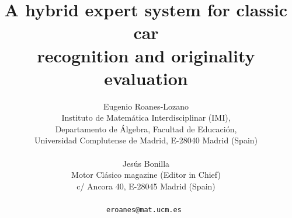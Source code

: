 \documentclass[a4paper]{article} %
\date{} %
\def\titulo#1{\title{#1}} %
\def\autores#1{\author{#1}} %
\begin{document}
\titulo{A hybrid expert system for classic car\\
        recognition and originality evaluation}
\autores{Eugenio Roanes-Lozano \\ %
       Instituto de Matem\'atica Interdisciplinar (IMI),\\
       Departamento de \'Algebra, Facultad de Educaci\'on, \\
       Universidad Complutense de Madrid, E-28040 Madrid (Spain) \\ \\
       Jes\'us Bonilla\\
       Motor Cl\'asico magazine (Editor in Chief)\\
       c/ Ancora 40, E-28045 Madrid (Spain)\\ \\
       \tt{eroanes@mat.ucm.es} %
       }%


\maketitle

\thispagestyle{empty}



\end{document}
